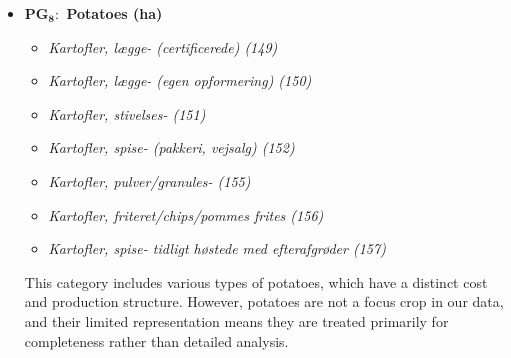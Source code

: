 \documentclass[12pt]{article}
\begin{document}
\begin{itemize}
    \item[] \textbf{PG$_\textbf{8}:$ Potatoes (ha)}
    \begin{itemize}
        \item[$+$] \textit{Kartofler, lægge- (certificerede) (149)} 
        \item[$+$] \textit{Kartofler, lægge- (egen opformering) (150)}
        \item[$+$] \textit{Kartofler, stivelses- (151)}
        \item[$+$] \textit{Kartofler, spise- (pakkeri, vejsalg) (152)}
        \item[$+$] \textit{Kartofler, pulver/granules- (155)}
        \item[$+$] \textit{Kartofler, friteret/chips/pommes frites (156)}
        \item[$+$] \textit{Kartofler, spise- tidligt høstede med efterafgrøder (157)}
    \end{itemize}
    This category includes various types of potatoes, which have a distinct cost and production structure. 
    However, potatoes are not a focus crop in our data, and their limited representation means they are treated primarily for completeness rather than detailed analysis.
    

\end{itemize}
\end{document}
